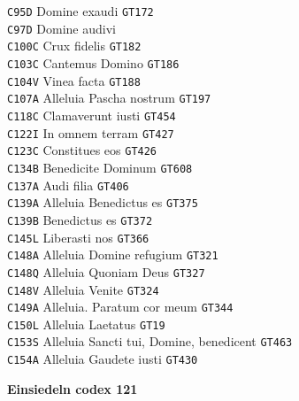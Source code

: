 \documentclass[a4paper]{article}
\begin{document}
{\begin{multicols}{2}
\texttt{C95D} Domine exaudi \texttt{GT172}\\
\texttt{C97D} Domine audivi\\
\texttt{C100C} Crux fidelis \texttt{GT182}\\
\texttt{C103C} Cantemus Domino \texttt{GT186}\\
\texttt{C104V} Vinea facta \texttt{GT188}\\
\texttt{C107A} Alleluia Pascha nostrum \texttt{GT197}\\
\texttt{C118C} Clamaverunt iusti \texttt{GT454}\\
\texttt{C122I} In omnem terram \texttt{GT427}\\
\texttt{C123C} Constitues eos \texttt{GT426}\\
\texttt{C134B} Benedicite Dominum \texttt{GT608}\\
\texttt{C137A} Audi filia \texttt{GT406}\\
\texttt{C139A} Alleluia Benedictus es \texttt{GT375}\\
\texttt{C139B} Benedictus es \texttt{GT372}\\
\texttt{C145L} Liberasti nos \texttt{GT366}\\
\texttt{C148A} Alleluia Domine refugium \texttt{GT321}\\
\texttt{C148Q} Alleluia Quoniam Deus \texttt{GT327}\\
\texttt{C148V} Alleluia Venite \texttt{GT324}\\
\texttt{C149A} Alleluia. Paratum cor meum \texttt{GT344}\\
\texttt{C150L} Alleluia Laetatus \texttt{GT19}\\
\texttt{C153S} Alleluia Sancti tui, Domine, benedicent \texttt{GT463}\\
\texttt{C154A} Alleluia Gaudete iusti \texttt{GT430}

\noindent\textbf{Einsiedeln codex 121}


\end{multicols}}
\end{document}
